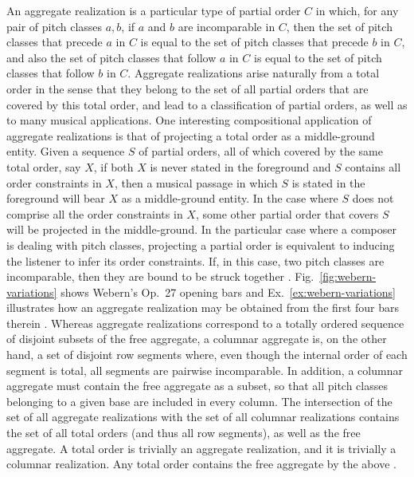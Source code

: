 An aggregate realization is a particular type of partial order $C$ in which, for any pair of pitch classes $a, b$, if $a$ and $b$ are incomparable in $C$, then the set of pitch classes that precede $a$ in $C$ is equal to the set of pitch classes that precede $b$ in $C$, and also the set of pitch classes that follow $a$ in $C$ is equal to the set of pitch classes that follow $b$ in $C$. Aggregate realizations arise naturally from a total order in the sense that they belong to the set of all partial orders that are covered by this total order, and lead to a classification of partial orders, as well as to many musical applications. One interesting compositional application of aggregate realizations is that of projecting a total order as a middle-ground entity. Given a sequence $S$ of partial orders, all of which covered by the same total order, say $X$, if both $X$ is never stated in the foreground and $S$ contains all order constraints in $X$, then a musical passage in which $S$ is stated in the foreground will bear $X$ as a middle-ground entity. In the case where $S$ does not comprise all the order constraints in $X$, some other partial order that covers $S$ will be projected in the middle-ground. In the particular case where a composer is dealing with pitch classes, projecting a partial order is equivalent to inducing the listener to infer its order constraints. If, in this case, two pitch classes are incomparable, then they are bound to be struck together \cite[197]{Starr1984}. Fig.~\ref{fig:webern-variations} shows Webern's Op.~27 opening bars and Ex.~\ref{ex:webern-variations} illustrates how an aggregate realization may be obtained from the first four bars therein \cite[203, 204]{Starr1984}. Whereas aggregate realizations correspond to a totally ordered sequence of disjoint subsets of the free aggregate, a columnar aggregate is, on the other hand, a set of disjoint row segments where, even though the internal order of each segment is total, all segments are pairwise incomparable. In addition, a columnar aggregate must contain the free aggregate as a subset, so that all pitch classes belonging to a given base are included in every column. The intersection of the set of all aggregate realizations with the set of all columnar realizations contains the set of all total orders (and thus all row segments), as well as the free aggregate. A total order is trivially an aggregate realization, and it is trivially a columnar realization. Any total order contains the free aggregate by the above \cite[201, 210]{Starr1984}.

